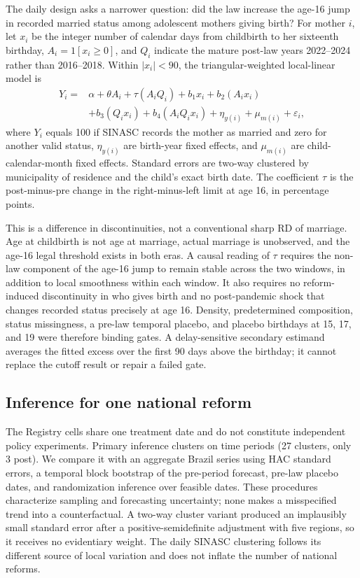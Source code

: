 \documentclass[12pt]{article}
\begin{document}
The daily design asks a narrower question: did the law increase the age-16 jump in
recorded married status among adolescent mothers giving birth? For mother $i$, let
$x_i$ be the integer number of calendar days from childbirth to her sixteenth birthday,
$A_i=1[x_i\geq0]$, and $Q_i$ indicate the mature post-law years 2022--2024 rather than
2016--2018. Within $|x_i|<90$, the triangular-weighted local-linear model is
\begin{equation}
 \begin{split}
 Y_i={}&\alpha+\theta A_i+\tau(A_iQ_i)+b_1x_i+b_2(A_ix_i)\\
       &+b_3(Q_ix_i)+b_4(A_iQ_ix_i)+\eta_{y(i)}+\mu_{m(i)}+\varepsilon_i,
 \end{split}
 \label{eq:daily}
\end{equation}
where $Y_i$ equals 100 if SINASC records the mother as married and zero for another
valid status, $\eta_{y(i)}$ are birth-year fixed effects, and $\mu_{m(i)}$ are child-
calendar-month fixed effects. Standard errors are two-way clustered by municipality of
residence and the child's exact birth date. The coefficient $\tau$ is the post-minus-pre
change in the right-minus-left limit at age 16, in percentage points.

This is a difference in discontinuities, not a conventional sharp RD of marriage. Age
at childbirth is not age at marriage, actual marriage is unobserved, and the age-16 legal
threshold exists in both eras. A causal reading of $\tau$ requires the non-law component
of the age-16 jump to remain stable across the two windows, in addition to local
smoothness within each window. It also requires no reform-induced discontinuity in who
gives birth and no post-pandemic shock that changes recorded status precisely at age 16.
Density, predetermined composition, status missingness, a pre-law temporal placebo, and
placebo birthdays at 15, 17, and 19 were therefore binding gates. A delay-sensitive
secondary estimand averages the fitted excess over the first 90 days above the birthday;
it cannot replace the cutoff result or repair a failed gate.

\subsection{Inference for one national reform}

The Registry cells share one treatment date and do not constitute independent policy
experiments. Primary inference clusters on time periods (27 clusters, only 3 post). We
compare it with an aggregate Brazil series using HAC standard errors, a temporal block
bootstrap of the pre-period forecast, pre-law placebo dates, and randomization inference
over feasible dates. These procedures characterize sampling and forecasting uncertainty;
none makes a misspecified trend into a counterfactual. A two-way cluster variant produced
an implausibly small standard error after a positive-semidefinite adjustment with five
regions, so it receives no evidentiary weight. The daily SINASC clustering follows its
different source of local variation and does not inflate the number of national reforms.
\end{document}

